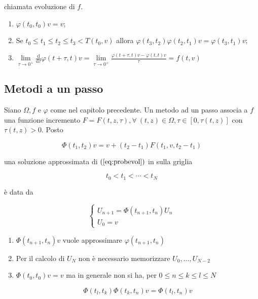 \documentclass[hidelinks, 10pt]{report}
\begin{document}
chiamata evoluzione di $ f $.

\begin{oss}
\noindent
\begin{enumerate}
\item $ \varphi(t_{0}, t_{0}) v = v $;
\item Se $ t_{0} \le t_{1} \le t_{2} \le t_{3} < T(t_{0}, v) $ allora $ \varphi(t_{3}, t_{2}) \varphi(t_{2}, t_{1}) v = \varphi(t_{3}, t_{1}) v $;
\item $ \lim\limits_{\tau \to 0^{+}} \frac{\mathrm{d}}{\mathrm{d} \tau} \varphi (t + \tau, t)v = \lim\limits_{\tau \to 0^{+}} \frac{\varphi(t + \tau, t)v - \varphi(t, t)v}{\tau} = f(t, v) $
\end{enumerate}
\end{oss}

\subsection{Metodi a un passo}

Siano $ \Omega, f $ e $ \varphi $ come nel capitolo precedente. Un metodo ad un passo associa a $ f $ una funzione incremento $ F = F(t, z, \tau), \forall\ (t, z) \in \Omega, \tau \in [0, \tau(t, z)] $ con $ \tau(t, z) > 0 $. Posto

\[ \Phi (t_{1}, t_{2}) v = v + (t_{2} - t_{1}) F(t_{1}, v, t_{2} - t_{1}) \]

una soluzione approssimata di $ (\ref{eq:probevol}) $ in  sulla griglia

\[ t_{0} < t_{1} < \dotsb < t_{N} \]

\`e data da 

\[
\begin{cases}
U_{n+1} = \Phi(t_{n + 1}, t_{n}) U_{n} \\
U_{0} = v
\end{cases}
\]

\begin{oss}
\noindent
\begin{enumerate}
\item $ \Phi(t_{n+1}, t_{n}) v $ vuole approssimare $ \varphi(t_{n + 1}, t_{n}) $
\item Per il calcolo di $ U_{N} $ non \`e necessario memorizzare $ U_{0}, \dotsc, U_{N - 2} $
\item $ \Phi (t_{0}, t_{0}) v = v $ ma in generale non si ha, per $ 0 \le n \le k \le l \le N $

\[ \Phi(t_{l}, t_{k}) \Phi(t_{k}, t_{n}) v  = \Phi(t_{l}, t_{n}) v \]
\end{enumerate}
\end{oss}
\end{document}

